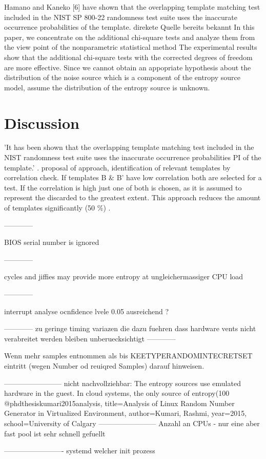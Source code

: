 Hamano and Kaneko [6] have shown that the
overlapping template matching test included in the NIST SP
800-22 randomness test suite uses the inaccurate occurrence
probabilities of the template.
 \cite{kangadditional} direkete Quelle bereits bekannt
In this paper, we concentrate on the additional chi-square tests and analyze them from the view point of the nonparametric
 statistical method \cite{kangadditional}
The experimental results show that the additional chi-square tests with the corrected degrees of freedom are more effective. \cite{kangadditional}
 Since we cannot obtain an appopriate hypothesis about the distribution of the noise source which is a component of the entropy source model, assume the distribution of the entropy source is unknown. \cite{kangadditional}




\section{Discussion}

'It has been shown that the overlapping template matching test included in the NIST randomness test suite uses the inaccurate occurrence probabilities PI of the template.'
\cite{hamano2007correction,chen2016templates}. \cite{chen2016templates} proposal of approach, identification of relevant templates by correlation check. If templates B \&  B' have low correlation
both are selected for a test. If the correlation is high just one of both is chosen, as it is assumed to represent the discarded to the greatest extent. This approach reduces the amount of templates significantly (50 \%) \cite{chen2016templates}.

------------

BIOS serial number is ignored

------------

cycles and jiffies may provide more entropy at ungleichermassiger CPU load

------------

interrupt analyse ocnfidence lvele 0.05 ausreichend ?

------------
zu geringe timing variazen die dazu fuehren dass hardware vents nicht verabreitet werden bleiben unberuecksichtigt
------------

 Wenn mehr samples entnommen als bis KEETYPERANDOMINTECRETSET eintritt (wegen Number od reuiqred Samples) darauf hinweisen.
 
 ------------------------
 nicht nachvollziehbar:
  The entropy sources use emulated hardware in the guest. In cloud systems, the only source of entropy(100%
 @phdthesis{kumari2015analysis,
     title={Analysis of Linux Random Number Generator in Virtualized Environment},
     author={Kumari, Rashmi},
     year={2015},
     school={University of Calgary}
 }
 ------------------------
 Anzahl an CPUs - nur eine aber fast pool ist sehr schnell gefuellt
 
 -------------------------
 systemd welcher  init prozess
